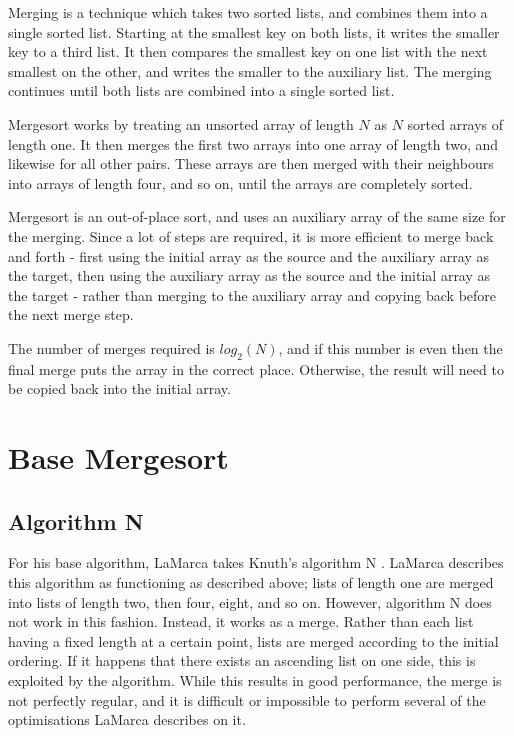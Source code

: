 \label{merge}
Merging is a technique which takes two sorted lists, and combines them into a
single sorted list. Starting at the smallest key on both lists, it writes the
smaller key to a third list. It then compares the smallest key on one list with
the next smallest on the other, and writes the smaller to the auxiliary list.
The merging continues until both lists are combined into a single sorted list.

Mergesort works by treating an unsorted array of length $N$ as $N$ sorted arrays of
length one. It then merges the first two arrays into one array of length two, and
likewise for all other pairs. These arrays are then merged with their neighbours
into arrays of length four, and so on, until the arrays are completely sorted.

Mergesort is an out-of-place sort, and uses an auxiliary array of the same size
for the merging. Since a lot of steps are required, it is more efficient to
merge back and forth - first using the initial array as the source and the
auxiliary array as the target, then using the auxiliary array as the source and
the initial array as the target - rather than merging to the auxiliary array and
copying back before the next merge step.

The number of merges required is $log_2(N)$, and if this number is even then
the final merge puts the array in the correct place. Otherwise, the result will
need to be copied back into the initial array.

\section{Base Mergesort}

\subsection{Algorithm N}
\label{Algorithm N}

For his base algorithm, LaMarca takes Knuth's algorithm N \cite{Knuth98}.
LaMarca describes this algorithm as functioning as described above; lists of
length one are merged into lists of length two, then four, eight, and so on.
However, algorithm N does not work in this fashion. Instead, it works as a
 merge. Rather than each list having a fixed length at a certain
point, lists are merged according to the initial ordering. If it happens that
there exists an ascending list on one side, this is exploited by the algorithm.
While this results in good performance, the merge is not perfectly regular, and
it is difficult or impossible to perform several of the optimisations LaMarca
describes on it.

